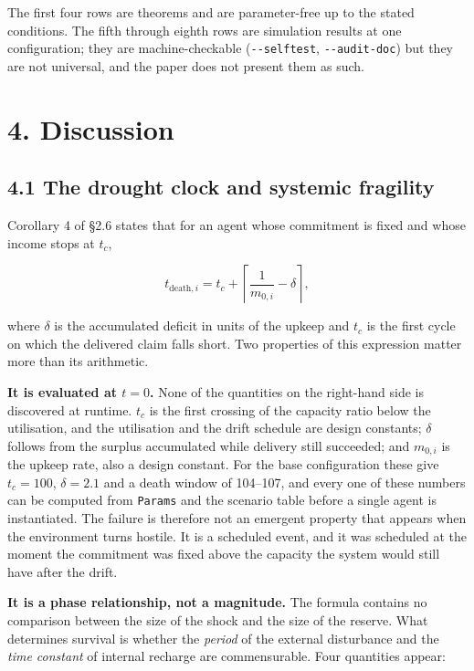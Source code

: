 \documentclass[11pt,a4paper]{article}
\begin{document}
The first four rows are theorems and are parameter-free up to the stated
conditions. The fifth through eighth rows are simulation results at one
configuration; they are machine-checkable (\texttt{-\/-selftest}, \texttt{-\/-audit-doc}) but they
are not universal, and the paper does not present them as such.


\section{4. Discussion}\label{discussion}

\subsection{4.1 The drought clock and systemic fragility}\label{the-drought-clock-and-systemic-fragility}

Corollary 4 of §2.6 states that for an agent whose commitment is fixed and whose
income stops at \(t_c\),

\[
t_{\mathrm{death},i}=t_c+\left\lceil\frac{1}{m_{0,i}}-\delta\right\rceil,
\]

where \(\delta\) is the accumulated deficit in units of the upkeep and \(t_c\) is the
first cycle on which the delivered claim falls short. Two properties of this
expression matter more than its arithmetic.

\textbf{It is evaluated at \(t=0\).} None of the quantities on the right-hand side is
discovered at runtime. \(t_c\) is the first crossing of the capacity ratio below the
utilisation, and the utilisation and the drift schedule are design constants;
\(\delta\) follows from the surplus accumulated while delivery still succeeded; and
\(m_{0,i}\) is the upkeep rate, also a design constant. For the base configuration
these give \(t_c=100\), \(\delta=2.1\) and a death window of 104--107, and every one of
these numbers can be computed from \texttt{Params} and the scenario table before a single
agent is instantiated. The failure is therefore not an emergent property that
appears when the environment turns hostile. It is a scheduled event, and it was
scheduled at the moment the commitment was fixed above the capacity the system
would still have after the drift.

\textbf{It is a phase relationship, not a magnitude.} The formula contains no
comparison between the size of the shock and the size of the reserve. What
determines survival is whether the \emph{period} of the external disturbance and the
\emph{time constant} of internal recharge are commensurable. Four quantities appear:
\end{document}
